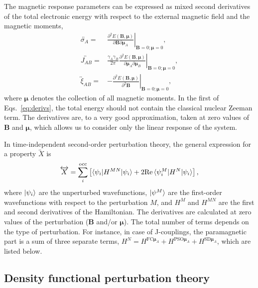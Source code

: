 The magnetic response parameters can be expressed as mixed second derivatives of the total electronic energy with respect to the external magnetic field and the magnetic moments,
\begin{equation}
  \label{eq:derivs}
  \begin{split}
    \overleftrightarrow{\sigma_A} =& \left. \frac{\partial^2 E(\bm B, \bm\mu)}{\partial\bm B\partial\bm\mu_A} \right|_{\bm B = 0; \bm\mu = 0}, \\
    \overleftrightarrow{J_{AB}} =& \frac{\gamma_A\gamma_B}{2\pi} \left. \frac{\partial^2 E(\bm B, \bm\mu)}{\partial\bm\mu_A\partial\bm\mu_B} \right|_{\bm B = 0; \bm\mu = 0}, \\
    \overleftrightarrow\xi_{AB} =& -\left. \frac{\partial^2 E(\bm B, \bm\mu)}{\partial^2\bm B} \right|_{\bm B = 0; \bm\mu = 0},
  \end{split}
\end{equation}
where $\bm\mu$ denotes the collection of all magnetic moments. In the first of Eqs.~\eqref{eq:derivs}, the total energy should not contain the classical nuclear Zeeman term. The derivatives are, to a very good approximation, taken at zero values of $\bm B$ and $\bm\mu$, which allows us to consider only the linear response of the system.

In time-independent second-order perturbation theory, the general expression for a property $\overleftrightarrow X$ is
\begin{equation}
  \label{eq:X_general}
  \overleftrightarrow X = \sum_i^{\text{occ}} \left[ \braket{\psi_i | H^{MN} | \psi_i} + 2 \mathrm{Re} \braket{\psi_i^M | H^N | \psi_i} \right],
\end{equation}
where $\ket{\psi_i}$ are the unperturbed wavefunctions, $\ket{\psi^M}$ are the first-order wavefunctions with respect to the perturbation $M$, and $H^M$ and $H^{MN}$ are the first and second derivatives of the Hamiltonian. The derivatives are calculated at zero values of the perturbation ($\bm B$ and/or $\bm\mu$). The total number of terms depends on the type of perturbation. For instance, in case of J-couplings, the paramagnetic part is a sum of three separate terms, $H^N = H^{\text{FC}\bm\mu_A} + H^{\text{PSO}\bm\mu_A} + H^{\text{SD}\bm\mu_A}$, which are listed below.

\subsection*{Density functional perturbation theory}


